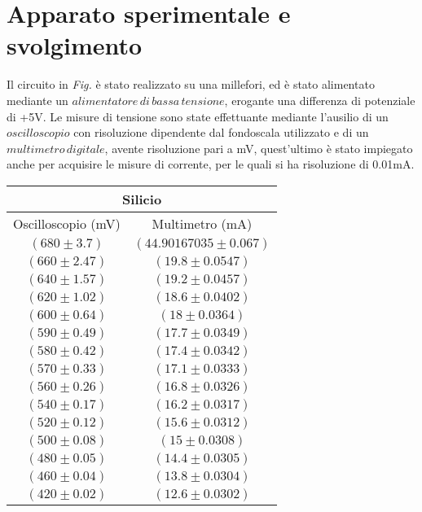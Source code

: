 \documentclass[@SRC@/main]{subfiles}
\begin{document}
\section{Apparato sperimentale e svolgimento} \label{sec:acquisizione}
  Il circuito in \textit{Fig.\!\!} è stato realizzato su una millefori, ed è stato alimentato mediante un $alimentatore\, di\, bassa\, tensione$, erogante una differenza di potenziale di +5V. 
  Le misure di tensione sono state effettuante mediante l'ausilio di un $oscilloscopio$ con risoluzione dipendente dal fondoscala utilizzato e di un $multimetro\, digitale$, avente risoluzione pari a  mV, quest'ultimo è stato impiegato anche per acquisire le misure di corrente, per le quali si ha risoluzione di 0.01mA.
  
  
  \begin{center}
    \begin{tabular}{ ||c|c|| }
        \hline
        \multicolumn{2}{||c||}{Silicio}\\
        \hline
        Oscilloscopio (mV) & Multimetro (mA) \\
        \hline
        $(680\pm 3.7 )$ & $(44.90167035\pm 0.067)$ \\
        \hline
        $(660\pm 2.47 )$ & $(19.8\pm 0.0547)$ \\
        \hline
        $(640\pm 1.57 )$ & $(19.2\pm 0.0457)$ \\
        \hline
        $(620\pm 1.02 )$ & $(18.6\pm0.0402)$\\
        \hline
        $(600\pm  0.64)$ & $(18\pm0.0364)$ \\
        \hline
        $(590\pm 0.49 )$ & $(17.7\pm0.0349)$ \\
        \hline
        $(580\pm 0.42 )$ & $(17.4\pm0.0342)$ \\
        \hline
        $(570\pm 0.33 )$ & $(17.1\pm0.0333)$ \\
        \hline
        $(560\pm 0.26 )$ & $(16.8\pm0.0326)$ \\
        \hline
        $(540\pm 0.17 )$ & $(16.2\pm0.0317)$ \\
        \hline
        $(520\pm 0.12  )$ & $(15.6\pm0.0312)$ \\
        \hline 
        $(500\pm 0.08 )$ & $( 15\pm0.0308)$ \\
        \hline 
        $(480\pm 0.05 )$ & $(14.4\pm0.0305 )$ \\
        \hline 
        $(460\pm 0.04 )$ & $( 13.8\pm0.0304)$ \\
        \hline 
        $(420\pm 0.02 )$ & $(12.6 \pm0.0302)$ \\
        \hline 
        
        
    \end{tabular}   
\end{center}
\end{document}

